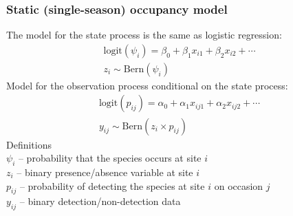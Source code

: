 \documentclass[color=usenames,dvipsnames]{beamer}\usepackage[]{graphicx}\usepackage[]{color}
\begin{document}



\begin{frame}
  \frametitle{Static (single-season) occupancy model}
  \small
  The model for the state process is the same as logistic regression:
  \begin{gather*}
    \mathrm{logit}(\psi_i) = \beta_0 + \beta_1 x_{i1} + \beta_2 x_{i2} + \cdots \\
    z_i \sim \mathrm{Bern}(\psi_i)
  \end{gather*}
  \pause
  \vfill
  Model for the observation process conditional on the state process:
  \begin{gather*}
    \mathrm{logit}(p_{ij}) = \alpha_0 + \alpha_1 x_{ij1} + \alpha_2 x_{ij2} + \cdots \\
    y_{ij} \sim \mathrm{Bern}(z_i\times p_{ij})
  \end{gather*}
  \pause
  Definitions \\
  $\psi_i$ -- probability that the species occurs at site $i$ \\
  $z_i$ -- binary presence/absence variable at site $i$ \\
  $p_{ij}$ -- probability of detecting the species at site $i$ on occasion $j$ \\
  $y_{ij}$ -- binary detection/non-detection data
\end{frame}
\end{document}

